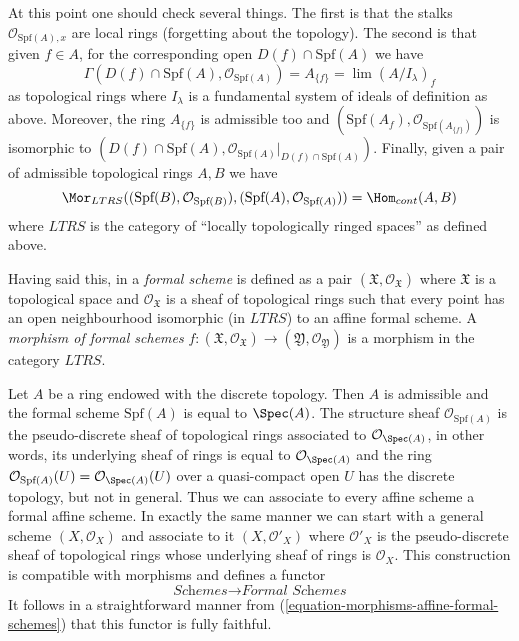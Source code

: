 \medskip\noindent
At this point one should check several things. The first is that
the stalks $\mathcal{O}_{\text{Spf}(A), x}$ are local rings
(forgetting about the topology). The second is that given
$f \in A$, for the corresponding open $D(f) \cap \text{Spf}(A)$
we have
$$
\Gamma(D(f) \cap \text{Spf}(A), \mathcal{O}_{\text{Spf}(A)})
= A_{\{f\}} = \lim (A/I_\lambda)_f
$$
as topological rings where $I_\lambda$ is a fundamental system of ideals
of definition as above. Moreover, the ring $A_{\{f\}}$ is admissible too and
$(\text{Spf}(A_f), \mathcal{O}_{\text{Spf}(A_{\{f\}})})$
is isomorphic to
$(D(f) \cap \text{Spf}(A),
\mathcal{O}_{\text{Spf}(A)}|_{D(f) \cap \text{Spf}(A)})$.
Finally, given a pair of admissible topological rings $A, B$
we have
\begin{equation}
\label{equation-morphisms-affine-formal-schemes}
\Mor_{LTRS}((\text{Spf}(B), \mathcal{O}_{\text{Spf}(B)}),
(\text{Spf}(A), \mathcal{O}_{\text{Spf}(A)}))
= \Hom_{cont}(A, B)
\end{equation}
where $LTRS$ is the category of ``locally topologically ringed spaces''
as defined above.

\medskip\noindent
Having said this, in \cite{EGA} a {\it formal scheme} is defined as a pair
$(\mathfrak X, \mathcal{O}_\mathfrak X)$ where $\mathfrak X$
is a topological space and $\mathcal{O}_\mathfrak X$ is a sheaf
of topological rings such that every point has an open neighbourhood
isomorphic (in $LTRS$) to an affine formal scheme.
A {\it morphism of formal schemes}
$f : (\mathfrak X, \mathcal{O}_\mathfrak X) \to
(\mathfrak Y, \mathcal{O}_\mathfrak Y)$
is a morphism in the category $LTRS$.

\medskip\noindent
Let $A$ be a ring endowed with the discrete topology. Then $A$ is
admissible and the formal scheme $\text{Spf}(A)$ is equal to
$\Spec(A)$. The structure sheaf $\mathcal{O}_{\text{Spf}(A)}$
is the pseudo-discrete sheaf of topological rings associated
to $\mathcal{O}_{\Spec(A)}$, in other words, its underlying
sheaf of rings is equal to $\mathcal{O}_{\Spec(A)}$ and the
ring $\mathcal{O}_{\text{Spf}(A)}(U) = \mathcal{O}_{\Spec(A)}(U)$
over a quasi-compact open $U$ has the discrete topology,
but not in general. Thus we can associate to every affine scheme
a formal affine scheme. In exactly the same manner we can start
with a general scheme $(X, \mathcal{O}_X)$ and associate to
it $(X, \mathcal{O}'_X)$ where $\mathcal{O}'_X$ is the
pseudo-discrete sheaf of topological rings whose underlying
sheaf of rings is $\mathcal{O}_X$. This construction is
compatible with morphisms and defines a functor
\begin{equation}
\label{equation-compare-schemes-formal-schemes}
\textit{Schemes} \longrightarrow \textit{Formal Schemes}
\end{equation}
It follows in a straightforward manner from
(\ref{equation-morphisms-affine-formal-schemes})
that this functor is fully faithful.

